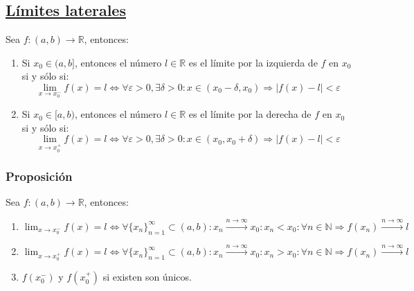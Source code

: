 \documentclass[10pt,a4paper,openright]{book}
\begin{document}
\subsection*{\underline{Límites laterales}}
Sea $f: (a,b)\longrightarrow \mathbb R$, entonces:
\begin{enumerate}
\item Si $x_0\in (a,b]$, entonces el número $l\in \mathbb R$ es el límite por la izquierda de $f$ en $x_0$ si y sólo si:
$$\lim_{x\rightarrow x_0^-}f(x)=l\Leftrightarrow \forall \varepsilon>0, \exists \delta>0: x\in (x_0-\delta, x_0)\Rightarrow |f(x)-l|<\varepsilon$$

\item Si $x_0\in [a,b)$, entonces el número $l\in \mathbb R$ es el límite por la derecha de $f$ en $x_0$ si y sólo si:
$$\lim_{x\rightarrow x_0^+}f(x)=l\Leftrightarrow \forall \varepsilon>0, \exists \delta>0: x\in (x_0, x_0+\delta)\Rightarrow |f(x)-l|<\varepsilon$$
\end{enumerate}

\subsubsection*{Proposición}
Sea $f: (a,b)\longrightarrow \mathbb R$, entonces:
\begin{enumerate}
\item $\lim_{x\rightarrow x_0^-}f(x)=l\Leftrightarrow \forall \{x_n\}_{n=1}^\infty \subset (a,b): x_n\xrightarrow{n\rightarrow \infty} x_0: x_n<x_0: \forall n\in \mathbb N\Rightarrow f(x_n)\xrightarrow{n\rightarrow \infty}l$

\item $\lim_{x\rightarrow x_0^+}f(x)=l\Leftrightarrow \forall \{x_n\}_{n=1}^\infty \subset (a,b): x_n\xrightarrow{n\rightarrow \infty} x_0: x_n>x_0: \forall n\in \mathbb N\Rightarrow f(x_n)\xrightarrow{n\rightarrow \infty}l$

\item $f(x_0^-)$ y $f(x_0^+)$ si existen son únicos.
\end{enumerate}
\end{document}
